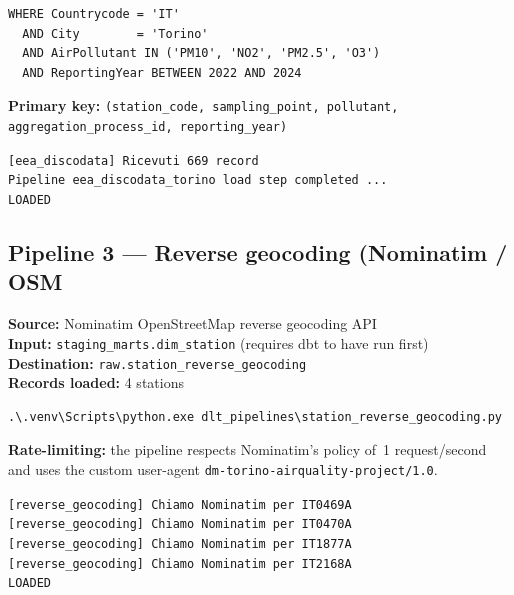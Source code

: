 \documentclass[11pt,a4paper]{article}
\begin{document}
\begin{lstlisting}[style=sql]
WHERE Countrycode = 'IT'
  AND City        = 'Torino'
  AND AirPollutant IN ('PM10', 'NO2', 'PM2.5', 'O3')
  AND ReportingYear BETWEEN 2022 AND 2024
\end{lstlisting}

\textbf{Primary key:} \texttt{(station\_code, sampling\_point, pollutant, aggregation\_process\_id, reporting\_year)}

\begin{tcolorbox}[successbox,title=Expected terminal output]
\texttt{[eea\_discodata] Ricevuti 669 record}\\
\texttt{Pipeline eea\_discodata\_torino load step completed ...}\\
\texttt{LOADED}
\end{tcolorbox}

\subsection{Pipeline 3 — Reverse geocoding (Nominatim / OSM}
\label{sec:geocoding}

\textbf{Source:} Nominatim OpenStreetMap reverse geocoding API\\
\textbf{Input:} \texttt{staging\_marts.dim\_station} (requires dbt to have run first)\\
\textbf{Destination:} \texttt{raw.station\_reverse\_geocoding}\\
\textbf{Records loaded:} 4 stations

\begin{lstlisting}[style=shell]
.\.venv\Scripts\python.exe dlt_pipelines\station_reverse_geocoding.py
\end{lstlisting}

\textbf{Rate-limiting:} the pipeline respects Nominatim's policy of~1 request/second and
uses the custom user-agent \texttt{dm-torino-airquality-project/1.0}.

\begin{tcolorbox}[successbox,title=Expected terminal output]
\texttt{[reverse\_geocoding] Chiamo Nominatim per IT0469A}\\
\texttt{[reverse\_geocoding] Chiamo Nominatim per IT0470A}\\
\texttt{[reverse\_geocoding] Chiamo Nominatim per IT1877A}\\
\texttt{[reverse\_geocoding] Chiamo Nominatim per IT2168A}\\
\texttt{LOADED}
\end{tcolorbox}
\end{document}
